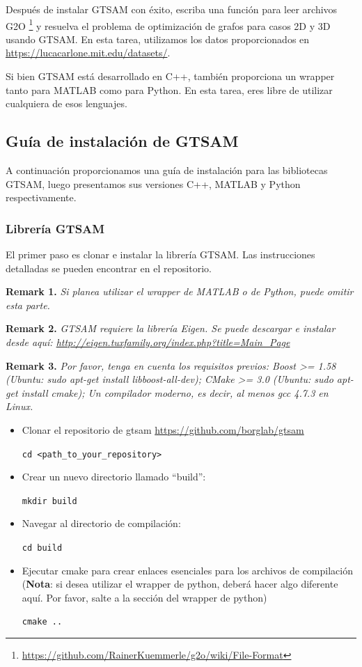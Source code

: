 \documentclass[tp]{lcc}
\begin{document}
Después de instalar GTSAM con éxito, escriba una función para leer archivos G2O \footnote{\url{https://github.com/RainerKuemmerle/g2o/wiki/File-Format}} y resuelva el problema de optimización de grafos para casos 2D y 3D usando GTSAM. En esta tarea, utilizamos los datos proporcionados en \url{https://lucacarlone.mit.edu/datasets/}.

Si bien GTSAM está desarrollado en C++, también proporciona un wrapper tanto para MATLAB como para Python. En esta tarea, eres libre de utilizar cualquiera de esos lenguajes.

\subsection*{Guía de instalación de GTSAM}
A continuación proporcionamos una guía de instalación para las bibliotecas GTSAM, luego presentamos sus versiones C++, MATLAB y Python respectivamente.

\subsubsection*{Librería GTSAM}
El primer paso es clonar e instalar la librería GTSAM. Las instrucciones detalladas se pueden encontrar en el repositorio.

\textbf{Remark 1.} \textit{Si planea utilizar el wrapper de MATLAB o de Python, puede omitir esta parte.}

\textbf{Remark 2.} \textit{GTSAM requiere la librería Eigen. Se puede descargar e instalar desde aquí: \url{http://eigen.tuxfamily.org/index.php?title=Main_Page}}

\textbf{Remark 3.} \textit{Por favor, tenga en cuenta los requisitos previos: Boost >= 1.58 (Ubuntu: sudo apt-get install libboost-all-dev); CMake >= 3.0 (Ubuntu: sudo apt-get install cmake); Un compilador moderno, es decir, al menos gcc 4.7.3 en Linux.}

\begin{itemize}
    \item Clonar el repositorio de gtsam \url{https://github.com/borglab/gtsam}
    
    \lstinline[style=bash]{cd <path_to_your_repository>}
    
    \item Crear un nuevo directorio llamado ``build'':
    
    \lstinline[style=bash]{mkdir build}
    
    \item Navegar al directorio de compilación:
    
    \lstinline[style=bash]{cd build}

    \item Ejecutar cmake para crear enlaces esenciales para los archivos de compilación (\textbf{Nota}: si desea utilizar el wrapper de python, deberá hacer algo diferente aquí. Por favor, salte a la sección del wrapper de python)

    \lstinline[style=bash]{cmake ..}
\end{itemize}
\end{document}
